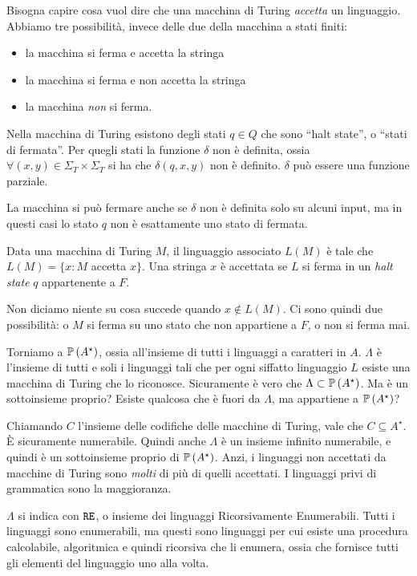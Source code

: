 Bisogna capire cosa vuol dire che una macchina di Turing \emph{accetta} un linguaggio. Abbiamo tre possibilit\`a, invece delle due della macchina a stati finiti:
\begin{itemize}
    \item la macchina si ferma e accetta la stringa
    \item la macchina si ferma e non accetta la stringa
    \item la macchina \emph{non} si ferma.
\end{itemize}

Nella macchina di Turing esistono degli stati $q \in Q$ che sono ``halt state'', o ``stati di fermata''. Per quegli stati la funzione $\delta$ non \`e definita, ossia $\forall (x,y) \in \Sigma_T \times \Sigma_T$ si ha che $\delta(q,x,y)$ non \`e definito. $\delta$ pu\`o essere una funzione parziale.

La macchina si pu\`o fermare anche se $\delta$ non \`e definita solo su alcuni input, ma in questi casi lo stato $q$ non \`e esattamente uno stato di fermata.

\begin{defn}
Data una macchina di Turing $M$, il linguaggio associato $L(M)$ \`e tale che $L(M) = \{ x : M $ accetta $ x \}$. Una stringa $x$ \`e accettata se $L$ si ferma in un \emph{halt state} $q$ appartenente a $F$.
\end{defn}

Non diciamo niente su cosa succede quando $x \notin L(M)$. Ci sono quindi due possibilit\`a: o $M$ si ferma su uno stato che non appartiene a $F$, o non si ferma mai.

Torniamo a $\mathbb{P} \left( {A^{\star}} \right)$, ossia all'insieme di tutti i linguaggi a caratteri in $A$. $\Lambda$ \`e l'insieme di tutti e soli i linguaggi tali che per ogni siffatto linguaggio $L$ esiste una macchina di Turing che lo riconosce. Sicuramente \`e vero che $\Lambda \subset \mathbb{P} \left( {A^{\star}} \right)$. Ma \`e un sottoinsieme proprio? Esiste qualcosa che \`e fuori da $\Lambda$, ma appartiene a $\mathbb{P} \left( {A^{\star}} \right)$?

Chiamando $C$ l'insieme delle codifiche delle macchine di Turing, vale che $C \subseteq A^{\star}$. \`E sicuramente numerabile. Quindi anche $\Lambda$ \`e un insieme infinito numerabile, e quindi \`e un sottoinsieme proprio di $\mathbb{P} \left( {A^{\star}} \right)$. Anzi, i linguaggi non accettati da macchine di Turing sono \emph{molti} di pi\`u di quelli accettati. I linguaggi privi di grammatica sono la maggioranza.

$\Lambda$ si indica con $\texttt{RE}$, o insieme dei linguaggi Ricorsivamente Enumerabili. Tutti i linguaggi sono enumerabili, ma questi sono linguaggi per cui esiste una procedura calcolabile, algoritmica e quindi ricorsiva che li enumera, ossia che fornisce tutti gli elementi del linguaggio uno alla volta.

